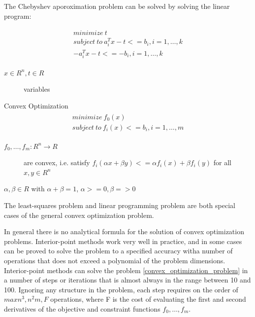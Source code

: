 \documentclass{beamer}
\begin{document}
\begin{frame}{}
The Chebyshev aporoximation problem can be solved by solving the linear program:

\begin{align}
\begin{split}
minimize~t \\
subject~to~ a_i^Tx-t <= b_i, i=1,\dots,k \\
-a_i^Tx - t <= -b_i, i=1,\dots,k
\end{split}
\end{align}
\begin{description}
\item [$x \in R^n, t \in R$] variables
\end{description}
\end{frame}


\begin{frame}{Convex Optimization}
\begin{align}
\begin{split}
\label{convex_optimization_problem}
minimize~f_{0}(x) \\
subject~to~f_i(x)<=b_i, i=1,\dots,m
\end{split}
\end{align}
\begin{description}
\item [$f_0,\dots,f_m: R^n \rightarrow R$] are convex, i.e. satisfy $f_i(\alpha x + \beta y) <= \alpha f_i(x) + \beta f_i(y)$ for all $x, y \in R^n$
\item [$\alpha, \beta \in R$ with $\alpha + \beta = 1$, $\alpha >= 0, \beta => 0$]
\end{description}
The least-squares problem and linear programming problem are both special cases of the general convex optimization problem.
\end{frame}


\begin{frame}{}
In general there is no analytical formula for the solution of convex optimization problems.
Interior-point methods work very well in practice, and in some cases can be proved to solve the problem to a specified accuracy witha number of operations that does not exceed a polynomial of the problem dimensions.
Interior-point methods can solve the problem \ref{convex_optimization_problem} in a number of steps or iterations that is almost always in the range between 10 and 100.
Ignoring any structure in the problem, each step requires on the order of $max{n^3,n^2m,F}$ operations, where F is the cost of evaluating the first and second derivatives of the objective and constraint functions $f_0,\dots,f_m$.
\end{frame}
\end{document}
